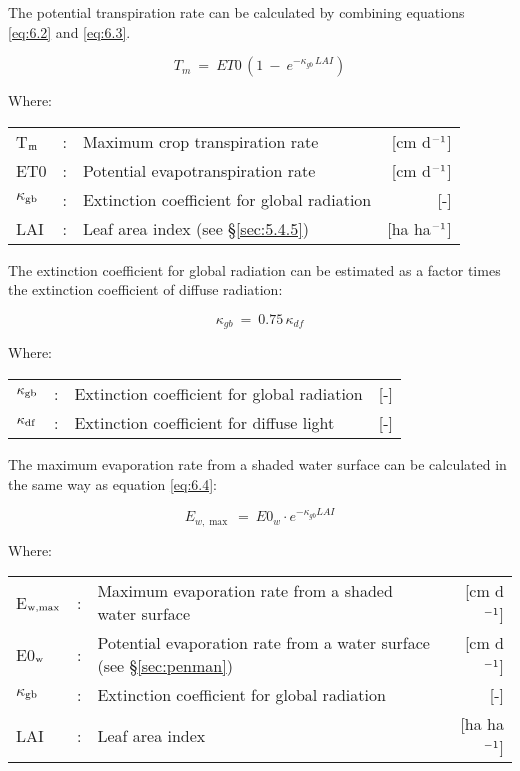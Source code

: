 The potential transpiration rate can be calculated by combining equations \ref{eq:6.2} and 
\ref{eq:6.3}.

\begin{equation}
\label{eq:6.4}
T _{m} ~=~ ET0\, (1~-~e ^{-\kappa _{gb} \, LAI} )
\end{equation}

Where:\\[5pt]
\begin{tabularx}{\textwidth}{llXr}
	T$_{{\rm m}}$ &:& Maximum crop transpiration rate & [cm d$^{{\rm -1}}$]\\
	ET0 &:& Potential evapotranspiration rate & [cm d$^{{\rm -1}}$]\\
	$\kappa$$_{{\rm gb}}$ &:& Extinction coefficient for global radiation & [-]\\
	LAI &:& Leaf area index (see \S \ref{sec:5.4.5}) & [ha ha$^{{\rm -1}}$]\\
\end{tabularx}

The extinction coefficient for global radiation can be estimated as a factor times the
extinction coefficient of diffuse radiation:

\begin{equation}
\label{eq:6.5}
\kappa_{gb} ~=~ 0.75\, \kappa_{df} 
\end{equation}

Where:\\[5pt]
\begin{tabularx}{\textwidth}{llXr}
	$\kappa_{{\rm gb}}$ &:& Extinction coefficient for global radiation & [-]\\
	$\kappa_{{\rm df}}$ &:& Extinction coefficient for diffuse light & [-]\\
\end{tabularx}

The maximum evaporation rate from a shaded water surface can be calculated in the same
way as equation \ref{eq:6.4}: 

\begin{equation}
\label{eq:6.6}
E_{w,\max } ~=~ E0_{w} \cdot e^{-\kappa_{gb} LAI}
\end{equation}

Where:\\[5pt]
\begin{tabularx}{\textwidth}{llXr}
	E$_{{\rm w,max}}$ &:& Maximum evaporation rate from a shaded water surface & 
	[cm d$^{{\rm -1}}$]\\
	E0$_{{\rm w}}$ &:& Potential evaporation rate from a water surface 
	(see \S \ref{sec:penman}) & [cm d$^{{\rm -1}}$]\\
	$\kappa$$_{{\rm gb}}$ &:& Extinction coefficient for global radiation & [-]\\
	LAI &:& Leaf area index & [ha ha$^{{\rm -1}}$]\\
\end{tabularx}

